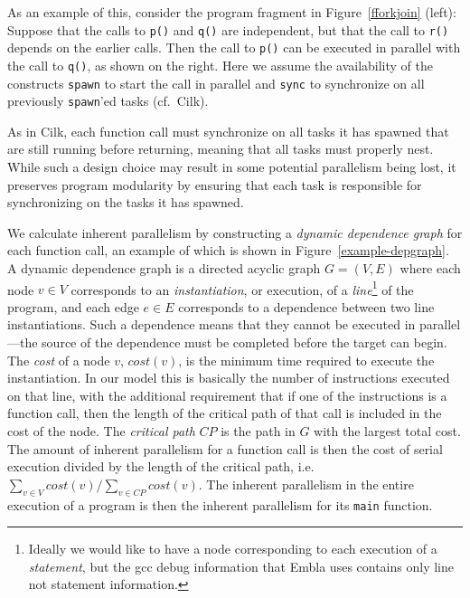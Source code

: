 As an example of this, consider the program fragment in
Figure~\ref{fforkjoin} (left):
Suppose that the calls to {\tt p()} and {\tt q()} are independent,
but that the call to {\tt r()} depends on the earlier calls. Then
the call to {\tt p()} can be
executed in parallel with
the call to {\tt q()}, as shown on the right.
Here we assume the availability of the constructs {\tt spawn} to start
the call in parallel and {\tt sync} to synchronize on all previously {\tt spawn}'ed
tasks (cf.\ Cilk).


As in Cilk, each function call must synchronize on all tasks it has spawned that are still running before returning, meaning that all tasks must properly nest.
While such a design choice may result in some potential parallelism being lost, it preserves program modularity by ensuring that each task is responsible for synchronizing on the tasks it has spawned.

We calculate inherent parallelism by constructing a \emph{dynamic dependence graph} for each function call, an example of which is shown in Figure~\ref{example-depgraph}.
A dynamic dependence graph is a directed acyclic graph $G=(V,E)$ where each node $v\in V$ corresponds to an \emph{instantiation}, or execution, of a \emph{line}\footnote{Ideally we would like to have a node corresponding to each execution of a \emph{statement}, but the gcc debug information that Embla uses contains only line not statement information.} of the program, and each edge $e\in E$ corresponds to a dependence between two line instantiations.
Such a dependence means that they cannot be executed in parallel---the source of the dependence must be completed before the target can begin.
The \emph{cost} of a node $v$, $\mathit{cost}(v)$, is the minimum time required to execute the instantiation.
In our model this is basically the number of instructions executed on that line, with the additional requirement that if one of the instructions is a function call, then the length of the critical path of that call is included in the cost of the node.
The \emph{critical path} $\mathit{CP}$ is the path in $G$ with the largest total cost.
The amount of inherent parallelism for a function call is then the cost of serial execution divided by the length of the critical path, i.e. $\sum_{v\in V} \mathit{cost}(v)/\sum_{v\in \mathit{CP}} \mathit{cost}(v)$.
The inherent parallelism in the entire execution of a program is then the inherent parallelism for its \texttt{main} function.

